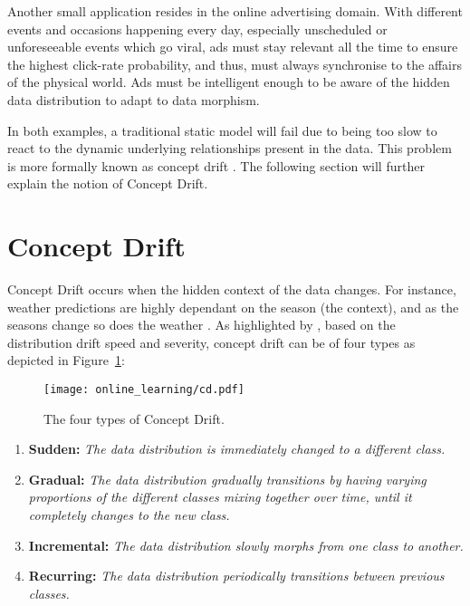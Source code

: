 Another small application resides in the online advertising domain. With different events and occasions happening every day, especially unscheduled or unforeseeable events which go viral, ads must stay relevant all the time to ensure the highest click-rate probability, and thus, must always synchronise to the affairs of the physical world. Ads must be intelligent enough to be aware of the hidden data distribution to adapt to data morphism.

In both examples, a traditional static model will fail due to being too slow to react to the dynamic underlying relationships present in the data. This problem is more formally known as concept drift \citep{schlimmer_incremental_1986}. The following section will further explain the notion of Concept Drift.

\section{Concept Drift} 

Concept Drift occurs when the hidden context of the data changes. For instance, weather predictions are highly dependant on the season (the context), and as the seasons change so does the weather \citep{widmer_learning_1996}. As highlighted by \citet{krawczyk_online_2018, Gama2014ASO}, based on the distribution drift speed and severity, concept drift can be of four types as depicted in Figure~\ref{fig:cd}:

\begin{figure}
  \texttt{[image: online\_learning/cd.pdf]}
  \caption{The four types of Concept Drift.}
  \label{fig:cd}
\end{figure}

\begin{enumerate}
\item \textbf{Sudden:}
\textit{The data distribution is immediately changed to a different class.}
\item \textbf{Gradual:}
\textit{The data distribution gradually transitions by having varying proportions of the different classes mixing together over time, until it completely changes to the new class.}
\item \textbf{Incremental:}
\textit{The data distribution slowly morphs from one class to another.}
\item \textbf{Recurring:}
\textit{The data distribution periodically transitions between previous classes.}
\end{enumerate}

